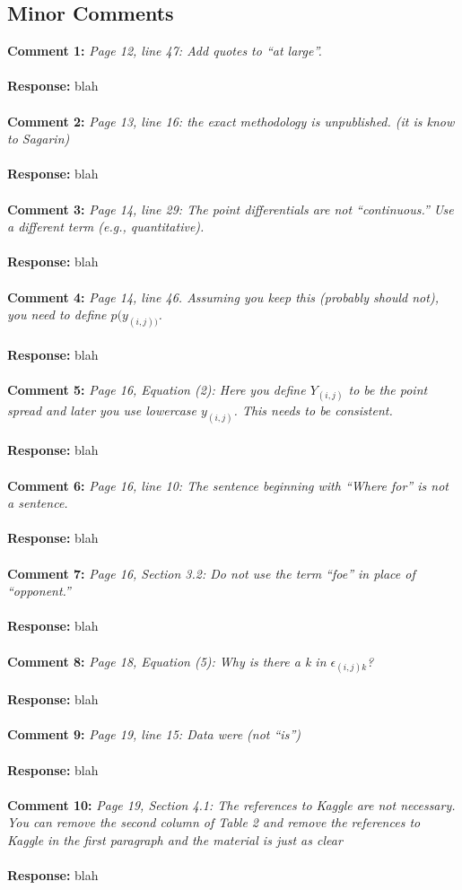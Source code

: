 \documentclass[11pt]{article} %
\begin{document}
\subsection*{Minor Comments}
{\bf Comment 1:} \emph{Page 12, line 47: Add quotes to ``at large''.}\\
\\
{\bf Response:} blah\\
\\
{\bf Comment 2:} \emph{Page 13, line 16: the exact methodology is unpublished. (it is know to Sagarin)}\\
\\
{\bf Response:} blah\\
\\
{\bf Comment 3:} \emph{Page 14, line 29: The point differentials are not ``continuous.'' Use a different term (e.g., quantitative).}\\
\\
{\bf Response:} blah\\
\\
{\bf Comment 4:} \emph{Page 14, line 46. Assuming you keep this (probably should not), you need to define $p(y_{(i,j))}$.}\\
\\
{\bf Response:} blah\\
\\
{\bf Comment 5:} \emph{Page 16, Equation (2): Here you define $Y_{(i,j)}$ to be the point spread and later you use lowercase $y_{(i,j)}$. This needs to be consistent.}\\
\\
{\bf Response:} blah\\
\\
{\bf Comment 6:} \emph{Page 16, line 10: The sentence beginning with ``Where for'' is not a sentence.}\\
\\
{\bf Response:} blah\\
\\
{\bf Comment 7:} \emph{Page 16, Section 3.2: Do not use the term ``foe'' in place of ``opponent.''}\\
\\
{\bf Response:} blah\\
\\
{\bf Comment 8:} \emph{Page 18, Equation (5): Why is there a k in $\epsilon_{(i,j)k}$?}\\
\\
{\bf Response:} blah\\
\\
{\bf Comment 9:} \emph{Page 19, line 15: Data were (not ``is'')}\\
\\
{\bf Response:} blah\\
\\
{\bf Comment 10:} \emph{Page 19, Section 4.1: The references to Kaggle are not necessary. You can remove the second column of Table 2 and remove the references to Kaggle in the first paragraph and the material is just as clear}\\
\\
{\bf Response:} blah\\
\\
\end{document}
